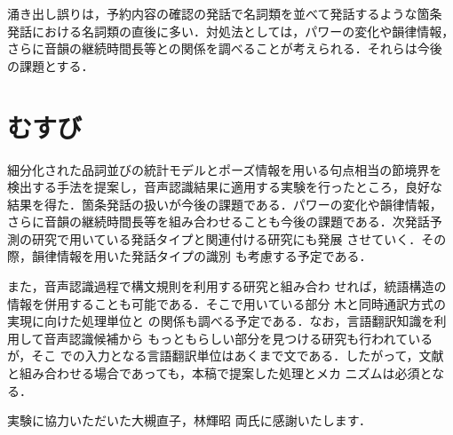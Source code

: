 涌き出し誤りは，予約内容の確認の発話で名詞類を並べて発話するような箇条
発話における名詞類の直後に多い．対処法としては，パワーの変化や韻律情報，
さらに音韻の継続時間長等との関係を調べることが考えられる．それらは今後
の課題とする．

\section{むすび}

細分化された品詞並びの統計モデルとポーズ情報を用いる句点相当の節境界を
検出する手法を提案し，音声認識結果に適用する実験を行ったところ，良好な
結果を得た．箇条発話の扱いが今後の課題である．パワーの変化や韻律情報，
さらに音韻の継続時間長等を組み合わせることも今後の課題である．次発話予
測の研究\cite{Iwadera96}で用いている発話タイプと関連付ける研究にも発展
させていく．その際，韻律情報を用いた発話タイプの識別
\cite{Fujio95,Fujio96}も考慮する予定である．

また，音声認識過程で構文規則を利用する研究\cite{Takezawa96}と組み合わ
せれば，統語構造の情報を併用することも可能である．そこで用いている部分
木\cite{Takezawa96}と同時通訳方式の実現に向けた処理単位\cite{Mima97}と
の関係も調べる予定である．なお，言語翻訳知識を利用して音声認識候補から
もっともらしい部分を見つける研究\cite{Wakita97}も行われているが，そこ
での入力となる言語翻訳単位はあくまで文である．したがって，文献
\cite{Wakita97}と組み合わせる場合であっても，本稿で提案した処理とメカ
ニズムは必須となる．

\acknowledgment

実験に協力いただいた大槻直子，林輝昭 両氏に感謝いたします．





\begin{biography}


\end{biography}


